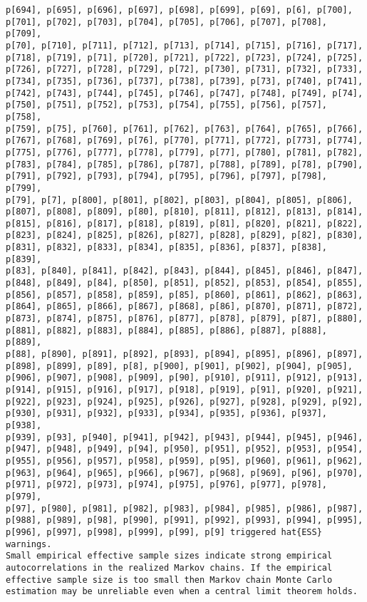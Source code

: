 \documentclass[
  letterpaper,
  DIV=11,
  numbers=noendperiod]{scrartcl}
\begin{document}
\begin{verbatim}
p[694], p[695], p[696], p[697], p[698], p[699], p[69], p[6], p[700],
p[701], p[702], p[703], p[704], p[705], p[706], p[707], p[708], p[709],
p[70], p[710], p[711], p[712], p[713], p[714], p[715], p[716], p[717],
p[718], p[719], p[71], p[720], p[721], p[722], p[723], p[724], p[725],
p[726], p[727], p[728], p[729], p[72], p[730], p[731], p[732], p[733],
p[734], p[735], p[736], p[737], p[738], p[739], p[73], p[740], p[741],
p[742], p[743], p[744], p[745], p[746], p[747], p[748], p[749], p[74],
p[750], p[751], p[752], p[753], p[754], p[755], p[756], p[757], p[758],
p[759], p[75], p[760], p[761], p[762], p[763], p[764], p[765], p[766],
p[767], p[768], p[769], p[76], p[770], p[771], p[772], p[773], p[774],
p[775], p[776], p[777], p[778], p[779], p[77], p[780], p[781], p[782],
p[783], p[784], p[785], p[786], p[787], p[788], p[789], p[78], p[790],
p[791], p[792], p[793], p[794], p[795], p[796], p[797], p[798], p[799],
p[79], p[7], p[800], p[801], p[802], p[803], p[804], p[805], p[806],
p[807], p[808], p[809], p[80], p[810], p[811], p[812], p[813], p[814],
p[815], p[816], p[817], p[818], p[819], p[81], p[820], p[821], p[822],
p[823], p[824], p[825], p[826], p[827], p[828], p[829], p[82], p[830],
p[831], p[832], p[833], p[834], p[835], p[836], p[837], p[838], p[839],
p[83], p[840], p[841], p[842], p[843], p[844], p[845], p[846], p[847],
p[848], p[849], p[84], p[850], p[851], p[852], p[853], p[854], p[855],
p[856], p[857], p[858], p[859], p[85], p[860], p[861], p[862], p[863],
p[864], p[865], p[866], p[867], p[868], p[86], p[870], p[871], p[872],
p[873], p[874], p[875], p[876], p[877], p[878], p[879], p[87], p[880],
p[881], p[882], p[883], p[884], p[885], p[886], p[887], p[888], p[889],
p[88], p[890], p[891], p[892], p[893], p[894], p[895], p[896], p[897],
p[898], p[899], p[89], p[8], p[900], p[901], p[902], p[904], p[905],
p[906], p[907], p[908], p[909], p[90], p[910], p[911], p[912], p[913],
p[914], p[915], p[916], p[917], p[918], p[919], p[91], p[920], p[921],
p[922], p[923], p[924], p[925], p[926], p[927], p[928], p[929], p[92],
p[930], p[931], p[932], p[933], p[934], p[935], p[936], p[937], p[938],
p[939], p[93], p[940], p[941], p[942], p[943], p[944], p[945], p[946],
p[947], p[948], p[949], p[94], p[950], p[951], p[952], p[953], p[954],
p[955], p[956], p[957], p[958], p[959], p[95], p[960], p[961], p[962],
p[963], p[964], p[965], p[966], p[967], p[968], p[969], p[96], p[970],
p[971], p[972], p[973], p[974], p[975], p[976], p[977], p[978], p[979],
p[97], p[980], p[981], p[982], p[983], p[984], p[985], p[986], p[987],
p[988], p[989], p[98], p[990], p[991], p[992], p[993], p[994], p[995],
p[996], p[997], p[998], p[999], p[99], p[9] triggered hat{ESS} warnings.
Small empirical effective sample sizes indicate strong empirical
autocorrelations in the realized Markov chains. If the empirical
effective sample size is too small then Markov chain Monte Carlo
estimation may be unreliable even when a central limit theorem holds.
 
\end{verbatim}
\end{document}
